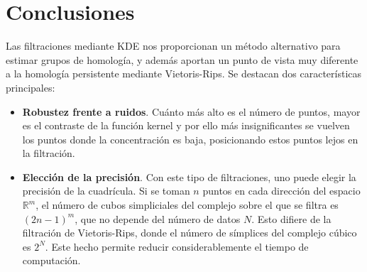 \documentclass[12pt,a4paper,twoside]{article} %
\theoremstyle{plain}
\theoremstyle{definition}
\newcommand{\R}{\mathbb{R}}
\newcommand*\NewPage{\newpage\null\thispagestyle{empty}\newpage}
\begin{document}
\newpage
\NewPage
\section{Conclusiones}

%
%

Las filtraciones mediante KDE nos proporcionan un método alternativo para estimar grupos de homología, y además aportan un punto de vista muy diferente a la homología persistente mediante Vietoris-Rips. Se destacan dos características principales:

\begin{itemize}
\item \textbf{Robustez frente a ruidos}. Cuánto más alto es el número de puntos, mayor es el contraste de la función kernel y por ello más insignificantes se vuelven los puntos donde la concentración es baja, posicionando estos puntos lejos en la filtración.
\item \textbf{Elección de la precisión}. Con este tipo de filtraciones, uno puede elegir la precisión de la cuadrícula. Si se toman $n$ puntos en cada dirección del espacio $\R^m$, el número de cubos simpliciales del complejo sobre el que se filtra es $(2n-1)^m$, que no depende del número de datos $N$. Esto difiere de la filtración de Vietoris-Rips, donde el número de símplices del complejo cúbico es $2^N$. Este hecho permite reducir considerablemente el tiempo de computación.
\end{itemize}
\end{document}
